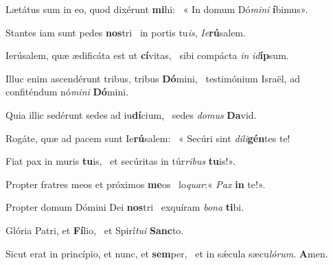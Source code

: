 \item Lætátus sum in eo, quod dixérunt \textbf{mi}hi:~\psstar{} « In domum Dó\textit{mini} \textbf{í}bimus».

\item Stantes iam sunt pedes \textbf{nos}tri~\psstar{} in portis tu\textit{is}, \textit{Ie}\textbf{rú}salem.

\item Ierúsalem, quæ ædificáta est ut \textbf{cí}vitas,~\psstar{} sibi compácta \textit{in} \textit{id}\textbf{íp}sum.

\item Illuc enim ascendérunt tribus, tribus \textbf{Dó}mini,~\psstar{} testimónium Israël, ad confiténdum nó\textit{mini} \textbf{Dó}mini.

\item Quia illic sedérunt sedes ad iu\textbf{dí}cium,~\psstar{} sedes \textit{domus} \textbf{Da}vid.

\item Rogáte, quæ ad pacem sunt Ie\textbf{rú}salem:~\psstar{} « Secúri sint \textit{dili}\textbf{gén}tes te!

\item Fiat pax in muris \textbf{tu}is,~\psstar{} et secúritas in túr\textit{ribus} \textbf{tu}is!».

\item Propter fratres meos et próximos \textbf{me}os~\psstar{} lo\textit{quar}:« \textit{Pax} \textbf{in} te!».

\item Propter domum Dómini Dei \textbf{nos}tri~\psstar{} exquíram \textit{bona} \textbf{ti}bi.

\item Glória Patri, et \textbf{Fí}lio,~\psstar{} et Spirí\textit{tui} \textbf{Sanc}to.

\item Sicut erat in princípio, et nunc, et \textbf{sem}per,~\psstar{} et in sǽcula sæcu\textit{lórum}. \textbf{A}men.